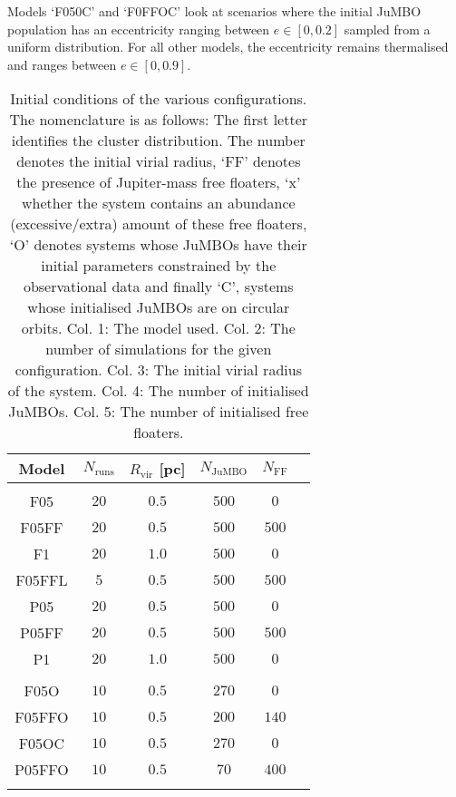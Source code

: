 \documentclass[aa]{aa}
\begin{document}
    Models `F050C' and `F0FFOC' look at scenarios where the initial JuMBO population has an eccentricity ranging between $e\in[0,0.2]$ sampled from a uniform distribution. For all other models, the eccentricity remains thermalised and ranges between $e\in[0,0.9]$.
 
    \begin{table}
         \caption{Initial conditions of the various configurations. The nomenclature is as follows: The first letter identifies the cluster distribution. The number denotes the initial virial radius, `FF' denotes the presence of Jupiter-mass free floaters, `x' whether the system contains an abundance (excessive/extra) amount of these free floaters, `O' denotes systems whose JuMBOs have their initial parameters constrained by the observational data and finally `C', systems whose initialised JuMBOs are on circular orbits. Col.  1: The model used. Col.  2: The number of simulations for the given configuration. Col.  3: The initial virial radius of the system. Col.  4: The number of initialised JuMBOs. Col.  5: The number of initialised free floaters.}
        \label{Tab:SF_FF_Params}
        \centering 
        \begin{tabular}{c c c c c c}
        \hline\hline
        Model & $N_{\mathrm{runs}}$ & $R_{\mathrm{vir}}$ [pc] & $N_{\mathrm{JuMBO}}$ & $N_{\mathrm{FF}}$\\
        \hline \vspace{-0.75em}\\ 
           F05     & $20$ & $0.5$ & $500$ & $0$   \\
           F05FF   & $20$ & $0.5$ & $500$ & $500$ \\
           F1      & $20$ & $1.0$ & $500$ & $0$   \\
           F05FFL  & $5$  & $0.5$ & $500$ & $500$ \\
           P05     & $20$ & $0.5$ & $500$ & $0$   \\
           P05FF   & $20$ & $0.5$ & $500$ & $500$ \\
           P1      & $20$ & $1.0$ & $500$ & $0$   \\
           \hline \vspace{-0.75em}\\
           F05O    & $10$ & $0.5$ & $270$ & $0$   \\
           F05FFO  & $10$ & $0.5$ & $200$ & $140$ \\
           F05OC   & $10$ & $0.5$ & $270$ & $0$   \\
           P05FFO  & $10$ & $0.5$ & $70$ & $400$  \\
           \hline
         \hline                                   %
         \label{Tab:ISF_FFC_Initial}
        \end{tabular}
     \end{table}
\end{document}
